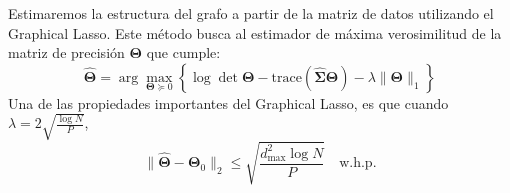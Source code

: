\documentclass{article}
\begin{document}
Estimaremos la estructura del grafo a partir de la matriz de datos utilizando el Graphical Lasso. Este método busca al estimador 
de máxima verosimilitud de la matriz de precisión $\boldsymbol{\Theta}$ que cumple:
\begin{equation}
\hat{\boldsymbol{\Theta}} = \arg \max_{\boldsymbol{\Theta} \succeq 0} \left\{ \log \det \boldsymbol{\Theta} - \text{trace}(\hat{\boldsymbol{\Sigma}} \boldsymbol{\Theta}) - \lambda \|\boldsymbol{\Theta}\|_1 \right\}
\end{equation}
Una de las propiedades importantes del Graphical Lasso, es que cuando $\lambda =  2\sqrt{\frac{\log N}{P}}$,
\begin{equation*}
    \|\hat{\boldsymbol{\Theta}} - \boldsymbol{\Theta}_0\|_2 \leq \sqrt{\frac{d_{\max}^2 \log N}{P}} \quad \text{w.h.p.}
\end{equation*}
\end{document}
